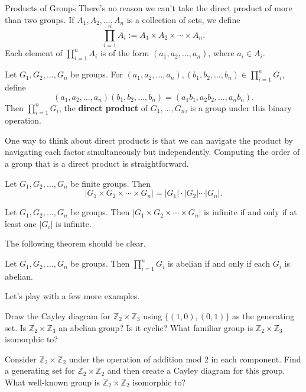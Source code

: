 \begin{section}{Products of Groups}
There's no reason we can't take the direct product of more than two groups.  If $A_1, A_2, \ldots, A_n$ is a collection of sets, we define
\[
\prod_{i=1}^nA_i:=A_1\times A_2\times \cdots \times A_n.
\]
Each element of $\prod_{i=1}^nA_i$ is of the form $(a_1,a_2,\ldots, a_n)$, where $a_i\in A_i$.

\begin{theorem}
Let $G_1, G_2,\ldots, G_n$ be groups.  For $(a_1,a_2, \ldots, a_n), (b_1,b_2,\ldots, b_n)\in \prod_{i=1}^nG_i$, define
\[
(a_1,a_2, \ldots, a_n)(b_1,b_2,\ldots, b_n)=(a_1b_1,a_2b_2,\ldots, a_nb_n).
\]
Then $\prod_{i=1}^nG_i$, the \textbf{direct product} of $G_1,\ldots, G_n$, is a group under this binary operation.
\end{theorem}

One way to think about direct products is that we can navigate the product by navigating each factor simultaneously but independently. Computing the order of a group that is a direct product is straightforward.

\begin{theorem}
Let $G_1, G_2,\ldots, G_n$ be finite groups.  Then
\[
|G_1\times G_2\times \cdots \times G_n|=|G_1|\cdot|G_2|\cdots |G_n|.
\]
\end{theorem}

\begin{theorem}
Let $G_1, G_2,\ldots, G_n$ be groups.  Then $|G_1\times G_2\times \cdots \times G_n|$ is infinite if and only if at least one $|G_i|$ is infinite.
\end{theorem}

The following theorem should be clear.

\begin{theorem}\label{thm:product_abelian_groups}
Let $G_1, G_2,\ldots, G_n$ be groups.  Then $\prod_{i=1}^nG_i$ is abelian if and only if each $G_i$ is abelian.
\end{theorem}

Let's play with a few more examples.

\begin{problem}
Draw the Cayley diagram for $\mathbb{Z}_2\times \mathbb{Z}_3$ using $\{(1,0),(0,1)\}$ as the generating set. Is $\mathbb{Z}_2\times \mathbb{Z}_3$ an abelian group?  Is it cyclic? What familiar group is $\mathbb{Z}_2\times \mathbb{Z}_3$ isomorphic to?
\end{problem}

\begin{problem}
Consider $\mathbb{Z}_2\times \mathbb{Z}_2$ under the operation of addition mod 2 in each component.  Find a generating set for $\mathbb{Z}_2\times \mathbb{Z}_2$ and then create a Cayley diagram for this group.  What well-known group is $\mathbb{Z}_2\times \mathbb{Z}_2$ isomorphic to?
\end{problem}


\end{section}
